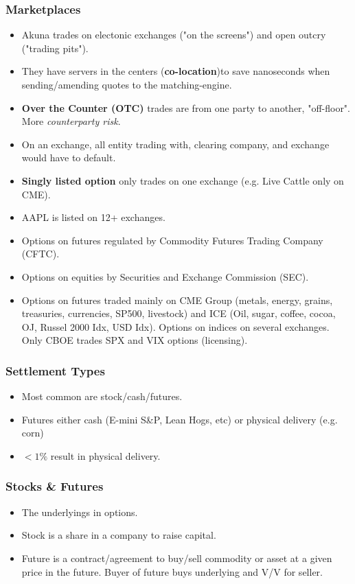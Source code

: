 \documentclass{article}
\begin{document}
\subsubsection{Marketplaces}
\begin{itemize}
    \item Akuna trades on electonic exchanges ("on the screens") and open outcry ("trading pits").
    \item They have servers in the centers (\textbf{co-location})to save nanoseconds when
sending/amending quotes to the matching-engine.
    \item \textbf{Over the Counter (OTC)} trades are from one party to another,
    "off-floor". More \textit{counterparty risk}.
    \item On an exchange, all entity trading with, clearing company, and exchange
    would have to default.
    \item \textbf{Singly listed option} only trades on one exchange
    (e.g. Live Cattle only on CME).
    \item AAPL is listed on 12+ exchanges.
    \item Options on futures regulated by Commodity Futures Trading Company (CFTC).
    \item Options on equities by Securities and Exchange Commission (SEC).
    \item Options on futures traded mainly on CME Group (metals, energy, grains,
    treasuries, currencies, SP500, livestock) and ICE (Oil, sugar, coffee,
    cocoa, OJ, Russel 2000 Idx, USD Idx). Options on indices on several exchanges.
    Only CBOE trades SPX and VIX options (licensing). 
\end{itemize}

\subsubsection{Settlement Types}
\begin{itemize}
    \item Most common are stock/cash/futures.
    \item Futures either cash (E-mini S\&P, Lean Hogs, etc) or physical delivery
    (e.g. corn)
    \item $<1\%$ result in physical delivery.
\end{itemize}

\subsubsection{Stocks \& Futures}
\begin{itemize}
    \item The underlyings in options.
    \item Stock is a share in a company to raise capital.
    \item Future is a contract/agreement to buy/sell commodity or asset at a 
    given price in the future. Buyer of future buys underlying and V/V for seller.
\end{itemize}
\end{document}
